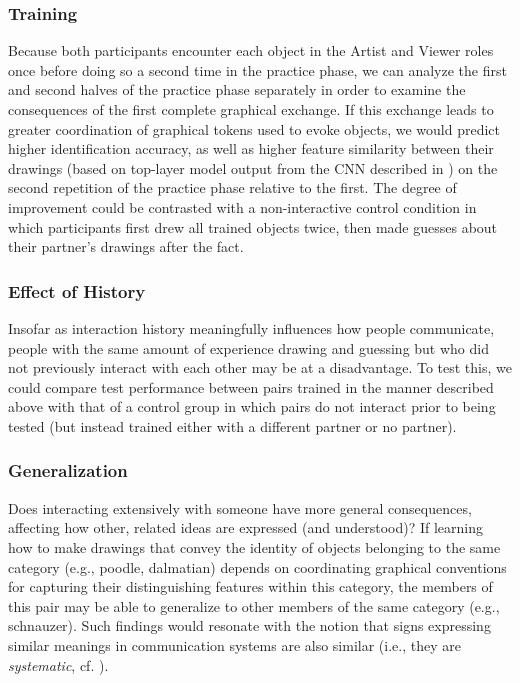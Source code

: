 \documentclass[12pt]{article}
\begin{document}
\subsubsection{Training}

Because both participants encounter each object in the Artist and Viewer roles once before doing so a second time in the practice phase, we can analyze the first and second halves of the practice phase separately in order to examine the consequences of the first complete graphical exchange. If this exchange leads to greater coordination of graphical tokens used to evoke objects, we would predict higher identification accuracy, as well as higher feature similarity between their drawings (based on top-layer model output from the CNN described in ) on the second repetition of the practice phase relative to the first. The degree of improvement could be contrasted with a non-interactive control condition in which participants first drew all trained objects twice, then made guesses about their partner's drawings after the fact. 

\subsubsection{Effect of History}

Insofar as interaction history meaningfully influences how people communicate, people with the same amount of experience drawing and guessing but who did not previously interact with each other may be at a disadvantage. To test this, we could compare test performance between pairs trained in the manner described above with that of a control group in which pairs do not interact prior to being tested (but instead trained either with a different partner or no partner).

\subsubsection{Generalization}

Does interacting extensively with someone have more general consequences, affecting how other, related ideas are expressed (and understood)? If learning how to make drawings that convey the identity of objects belonging to the same category (e.g., poodle, dalmatian) depends on coordinating graphical conventions for capturing their distinguishing features within this category, the members of this pair may be able to generalize to other members of the same category (e.g., schnauzer). Such findings would resonate with the notion that signs expressing similar meanings in communication systems are also similar (i.e., they are \textit{systematic}, cf. ). 
\end{document}
